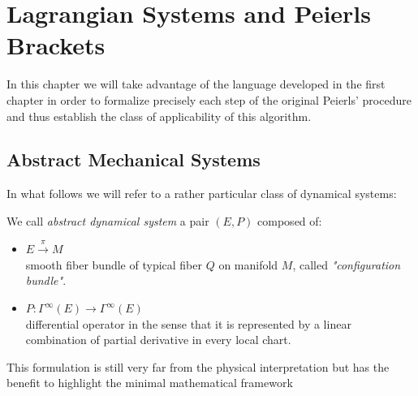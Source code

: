 \documentclass[Main]{subfiles}
\begin{document}
\chapter{Lagrangian Systems and Peierls Brackets}
In this chapter we will take advantage of the language developed in the first chapter in order to  formalize precisely each step of the original Peierls' procedure\cite{Peierls1952} and thus establish the class of applicability of this algorithm. 
  
	\section{Abstract Mechanical Systems}
	In what follows we will refer to a rather particular class of dynamical systems:
	
	\begin{definition}\label{Def:AbstracDynamicalSystem}
		We call \emph{abstract dynamical system} 
		a pair $(E,P )$ composed of:
		\begin{itemize}
			\item $E \xrightarrow{\pi} M$ \\
			smooth fiber bundle of typical fiber $Q$ on  manifold $M$, called \emph{"configuration bundle"}.
			\item	$ P : \Gamma^\infty(E) \rightarrow \Gamma^\infty(E)$ \\
			differential operator %
			in the sense that it is represented by a linear combination of partial derivative in every local chart.
		\end{itemize}
	\end{definition}
	This formulation is still very far from the physical interpretation but has the benefit to highlight the minimal mathematical framework
	
\end{document}
